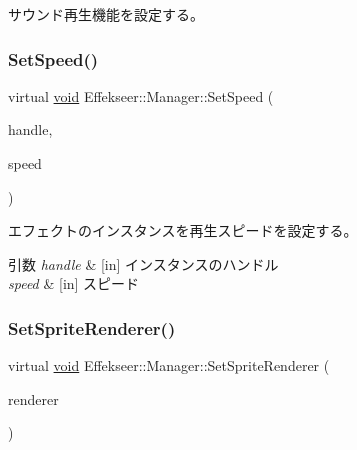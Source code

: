 サウンド再生機能を設定する。 

\mbox{\label{class_effekseer_1_1_manager_aa85b08562c442cfdce24781158a71431}} 
\subsubsection{\texorpdfstring{Set\+Speed()}{SetSpeed()}}
{\footnotesize\ttfamily virtual \mbox{\hyperlink{namespace_effekseer_ab34c4088e512200cf4c2716f168deb56}{void}} Effekseer\+::\+Manager\+::\+Set\+Speed (\begin{DoxyParamCaption}\item[{\mbox{\hyperlink{namespace_effekseer_afba58b8d812da862190e9bbfc040824a}{Handle}}}]{handle,  }\item[{float}]{speed }\end{DoxyParamCaption})\hspace{0.3cm}{\ttfamily [pure virtual]}}



エフェクトのインスタンスを再生スピードを設定する。 


\begin{DoxyParams}{引数}
{\em handle} & \mbox{[}in\mbox{]} インスタンスのハンドル \\
\hline
{\em speed} & \mbox{[}in\mbox{]} スピード \\
\hline
\end{DoxyParams}
\mbox{\label{class_effekseer_1_1_manager_a1b4f22221e7068d6604c18aa4ca4b80e}} 
\subsubsection{\texorpdfstring{Set\+Sprite\+Renderer()}{SetSpriteRenderer()}}
{\footnotesize\ttfamily virtual \mbox{\hyperlink{namespace_effekseer_ab34c4088e512200cf4c2716f168deb56}{void}} Effekseer\+::\+Manager\+::\+Set\+Sprite\+Renderer (\begin{DoxyParamCaption}\item[{\mbox{\hyperlink{class_effekseer_1_1_sprite_renderer}{Sprite\+Renderer}} $\ast$}]{renderer }\end{DoxyParamCaption})\hspace{0.3cm}{\ttfamily [pure virtual]}}



